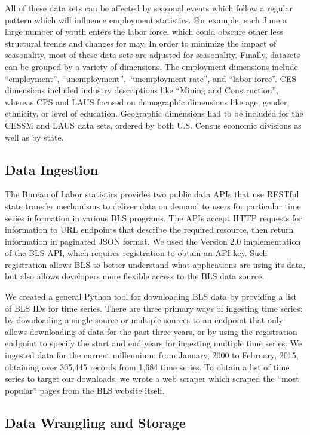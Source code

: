 \documentclass[journal]{IEEEtran}
\begin{document}
{All of these data sets can be affected by seasonal events which follow a regular pattern which will influence employment statistics. For example, each June a large number of youth enters the labor force, which could obscure other less structural trends and changes for may. In order to minimize the impact of seasonality, most of these data sets are adjusted for seasonality. Finally, datasets can be grouped by a variety of dimensions. The employment dimensions include ``employment'', ``unemployment'', ``unemployment rate'', and ``labor force''. CES dimensions included industry descriptions like ``Mining and Construction'', whereas CPS and LAUS focused on demographic dimensions like age, gender, ethnicity, or level of education. Geographic dimensions had to be included for the CESSM and LAUS data sets, ordered by both U.S. Census economic divisions as well as by state.

\subsection{Data Ingestion}

The Bureau of Labor statistics provides two public data APIs that use RESTful state transfer mechanisms to deliver data on demand to users for particular time series information in various BLS programs. The APIs accept HTTP requests for information to URL endpoints that describe the required resource, then return information in paginated JSON format. We used the Version 2.0 implementation of the BLS API, which requires registration to obtain an API key. Such registration allows BLS to better understand what applications are using its data, but also allows developers more flexible access to the BLS data source.

We created a general Python tool for downloading BLS data by providing a list of BLS IDs for time series. There are three primary ways of ingesting time series: by downloading a single source or multiple sources to an endpoint that only allows downloading of data for the past three years, or by using the registration endpoint to specify the start and end years for ingesting multiple time series. We ingested data for the current millennium: from January, 2000 to February, 2015, obtaining over 305,445 records from 1,684 time series. To obtain a list of time series to target our downloads, we wrote a web scraper which scraped the ``most popular'' pages from the BLS website itself.

\subsection{Data Wrangling and Storage}

}
\end{document}
